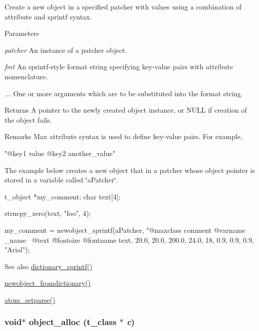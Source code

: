 Create a new object in a specified patcher with values using a combination of attribute and sprintf syntax. 
\begin{DoxyParams}{Parameters}
\item[{\em patcher}]An instance of a patcher object. \item[{\em fmt}]An sprintf-\/style format string specifying key-\/value pairs with attribute nomenclature. \item[{\em ...}]One or more arguments which are to be substituted into the format string. \end{DoxyParams}
\begin{DoxyReturn}{Returns}
A pointer to the newly created object instance, or NULL if creation of the object fails.
\end{DoxyReturn}
\begin{DoxyRemark}{Remarks}
Max attribute syntax is used to define key-\/value pairs. For example, 
\begin{DoxyCode}
    "@key1 value @key2 another_value"
\end{DoxyCode}


The example below creates a new object that in a patcher whose object pointer is stored in a variable called \char`\"{}aPatcher\char`\"{}. 
\begin{DoxyCode}
    t_object *my_comment;
    char text[4];
    
    strncpy_zero(text, "foo", 4);

    my_comment = newobject_sprintf(aPatcher, "@maxclass comment @varname _name \
        @text \"%
        @fontsize %
        @fontname %
        text, 20.0, 20.0, 200.0, 24.0,
        18, 0.9, 0.9, 0.9, "Arial");
\end{DoxyCode}

\end{DoxyRemark}
\begin{DoxySeeAlso}{See also}
\hyperlink{group__dictionary_ga77d5bafc260f9fc0bf3b4ad35f2b2629}{dictionary\_\-sprintf()} 

\hyperlink{group__obj_gaed2c4e1d0c80d929b97ccf07a886faeb}{newobject\_\-fromdictionary()} 

\hyperlink{group__atom_ga55938aedb41a8f3565680cf29169dc70}{atom\_\-setparse()} 
\end{DoxySeeAlso}
\hypertarget{group__obj_gacb89ef27c34b45e9037d877375804284}{
\subsubsection[{object\_\-alloc}]{\setlength{\rightskip}{0pt plus 5cm}void$\ast$ object\_\-alloc ({\bf t\_\-class} $\ast$ {\em c})}}
\label{group__obj_gacb89ef27c34b45e9037d877375804284}



